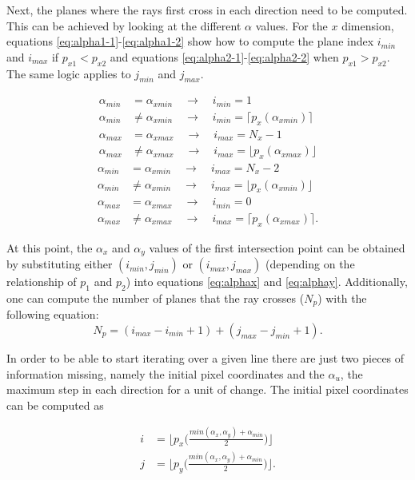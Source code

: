 Next, the planes where the rays first cross in each direction need to be computed. This can be achieved by looking at the different $\alpha$ values. For the $x$ dimension, equations \ref{eq:alpha1-1}-\ref{eq:alpha1-2} show how to compute the plane index $i_{min}$ and $i_{max}$ if $p_{x1}<p_{x2}$ and equations \ref{eq:alpha2-1}-\ref{eq:alpha2-2} when $p_{x1}>p_{x2}$. The same logic applies to $j_{min}$ and $j_{max}$.

\begin{align}
\alpha_{min}&=\alpha_{xmin}\quad \rightarrow\quad i_{min}=1 \label{eq:alpha1-1}
\\
\alpha_{min}&\neq\alpha_{xmin}\quad \rightarrow\quad i_{min}=\lceil{ p_x(\alpha_{xmin})}\rceil \\
\alpha_{max}&=\alpha_{xmax}\quad \rightarrow\quad i_{max}=N_x-1\\
\alpha_{max}&\neq\alpha_{xmax}\quad \rightarrow\quad i_{max}=\lfloor{ p_x(\alpha_{xmax})}\rfloor 
\label{eq:alpha1-2}
\end{align}
\begin{align}
\alpha_{min}&=\alpha_{xmin}\quad \rightarrow\quad i_{max}=N_x-2 \label{eq:alpha2-1}\\
\alpha_{min}&\neq\alpha_{xmin}\quad \rightarrow\quad i_{max}=\lfloor{ p_x(\alpha_{xmin})}\rfloor \\
\alpha_{max}&=\alpha_{xmax} \quad\rightarrow\quad i_{min}=0\\
\alpha_{max}&\neq\alpha_{xmax} \quad\rightarrow\quad i_{max}=\lceil{ p_x(\alpha_{xmax})}\rceil .
\label{eq:alpha2-2}
\end{align}

At this point, the $\alpha_x$ and $\alpha_y$ values of the first intersection point can be obtained by substituting either $(i_{min},j_{min})$ or $(i_{max},j_{max})$ (depending on the relationship of $p_1$ and $p_2$) into equations \ref{eq:alphax} and \ref{eq:alphay}. Additionally, one can compute the number of planes that the ray crosses ($N_p$) with the following equation:
\begin{equation}
N_p=(i_{max}-i_{min}+1)+(j_{max}-j_{min}+1).
\end{equation}

In order to be able to start iterating over a given line there are just two pieces of information missing, namely the initial pixel coordinates and the $\alpha_u$, the maximum step in each direction for a unit of change. The initial pixel coordinates can be computed as

\begin{align}
i&=\bigg\lfloor{p_x\Big(\frac{min(\alpha_x,\alpha_y)+\alpha_{min}}{2}\Big)}\bigg\rfloor\\
j&=\bigg\lfloor{p_y\Big(\frac{min(\alpha_x,\alpha_y)+\alpha_{min}}{2}\Big)}\bigg\rfloor.
\end{align}

